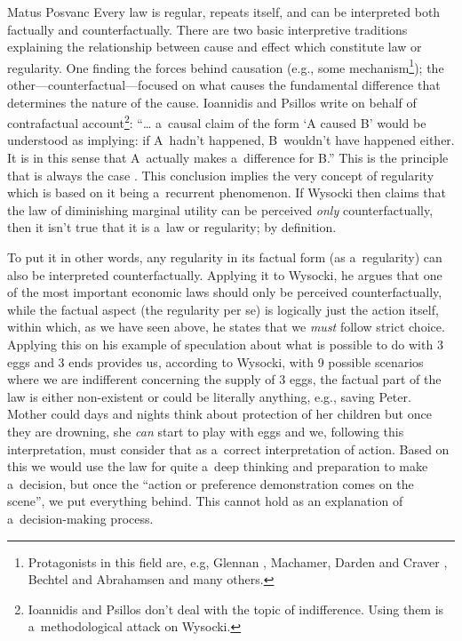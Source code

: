 \begin{artengenv}{Matus Posvanc}
Every law is regular, repeats itself, and can be interpreted both factually and counterfactually. There are two basic interpretive traditions explaining the relationship between cause and effect which constitute law or regularity. One finding the forces behind causation (e.g., some mechanism\footnote{Protagonists in this field are, e.g, Glennan 
\parencite*[][]{Glennan1996Mechanisms}, %
 Machamer, Darden and Craver 
\parencite*[][]{Machamer2000Thinking}, %
 Bechtel and Abrahamsen 
\parencite*[][]{Bechtel2005Explanation} %
 and many others. }); the other---counterfactual---focused on what causes the fundamental difference that determines the nature of the cause. Ioannidis and Psillos 
\parencite*[][p.144]{Ioannidis2018Mechanisms} %
 write on behalf of contrafactual account\footnote{Ioannidis and Psillos don't deal with the topic of indifference. Using them is a~methodological attack on Wysocki.}: ``… a~causal claim of the form ‘A caused B' would be understood as implying: if A~hadn't happened, B~wouldn't have happened either. It is in this sense that A~actually makes a~difference for B.'' This is the principle that is always the case 
\parencite[except for a~once-existing or irregular mechanism, see][p.153]{Ioannidis2018Mechanisms}. %
 This conclusion implies the very concept of regularity which is based on it being a~recurrent phenomenon. If Wysocki then claims that the law of diminishing marginal utility can be perceived \textit{only} counterfactually, then it isn't true that it is a~law or regularity; by definition.



To put it in other words, any regularity in its factual form (as a~regularity) can also be interpreted counterfactually. Applying it to Wysocki, he argues that one of the most important economic laws should only be perceived counterfactually, while the factual aspect (the regularity per se) is logically just the action itself, within which, as we have seen above, he states that we \textit{must} follow strict choice. Applying this on his example of speculation about what is possible to do with 3 eggs and 3 ends provides us, according to Wysocki, with 9 possible scenarios where we are indifferent concerning the supply of 3 eggs, the factual part of the law is either non-existent or could be literally anything, e.g., saving Peter. Mother could days and nights think about protection of her children but once they are drowning, she \textit{can} start to play with eggs and we, following this interpretation, must consider that as a~correct interpretation of action. Based on this we would use the law for quite a~deep thinking and preparation to make a~decision, but once the ``action or preference demonstration comes on the scene'', we put everything behind. This cannot hold as an explanation of a~decision-making process.




\end{artengenv}
